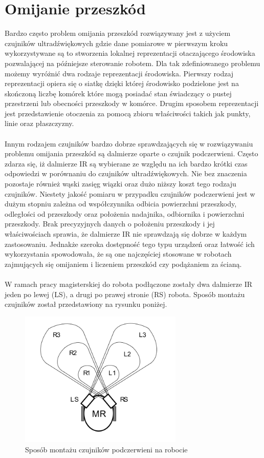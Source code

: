 \section{Omijanie przeszkód}
Bardzo często problem omijania przeszkód rozwiązywany jest z użyciem czujników
ultradźwiękowych gdzie dane pomiarowe w pierwszym kroku wykorzystywane są to
stworzenia lokalnej reprezentacji otaczającego środowiska pozwalającej na
późniejsze sterowanie robotem\cite{ObstaclesAvoidanceIR}. Dla tak zdefiniowanego
problemu możemy wyróżnić dwa rodzaje reprezentacji środowiska. Pierwszy rodzaj
reprezentacji opiera się o siatkę dzięki której środowisko podzielone jest na
skończoną liczbę komórek które mogą posiadać stan świadczący o pustej
przestrzeni lub obecności przeszkody w komórce. Drugim sposobem reprezentacji
jest przedstawienie otoczenia za pomocą zbioru właściwości takich jak punkty,
linie oraz płaszczyzny. \\
\\
Innym rodzajem czujników bardzo dobrze sprawdzających się w rozwiązywaniu
problemu omijania przeszkód są dalmierze oparte o czujnik podczerwieni. Często
zdarza się, iż dalmierze IR są wybierane ze względu na ich bardzo krótki czas
odpowiedzi w porównaniu do czujników ultradźwiękowych. Nie bez znaczenia
pozostaje również wąski zasięg wiązki oraz dużo niższy koszt tego rodzaju
czujników. Niestety jakość pomiaru w przypadku czujników podczerwieni jest w
dużym stopniu zależna od współczynnika odbicia powierzchni przeszkody, 
odległości od przeszkody oraz położenia nadajnika, odbiornika i powierzchni
przeszkody. Brak precyzyjnych danych o położeniu przeszkody i jej
właściwościach sprawia, że dalmierze IR nie sprawdzają się dobrze w każdym
zastosowaniu. Jednakże szeroka dostępność tego typu urządzeń oraz łatwość ich
wykorzystania spowodowała, że są one najczęściej stosowane w robotach
zajmujących się omijaniem i liczeniem przeszkód czy podążaniem za ścianą.\\
\\
W ramach pracy magisterskiej do robota podłączone zostały dwa dalmierze IR jeden
po lewej (LS), a drugi po prawej stronie (RS) robota. Sposób montażu czujników
został przedstawiony na rysunku poniżej. 

\begin{figure}[hb]
 \centering
 \includegraphics[height=65mm]{../images/ch04/ir_sensor_position.png}
 \caption{Sposób montażu czujników podczerwieni na robocie}
 \label{fig:IRSensorPosition}
\end{figure}

